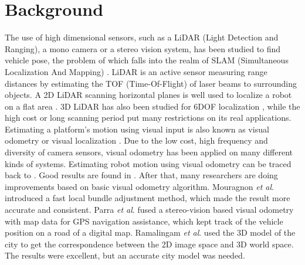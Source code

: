 \documentclass[letterpaper, 10 pt, conference]{ieeeconf}  %
\begin{document}
\section{Background}
\label{sec_background}

The use of high dimensional sensors, such as a LiDAR (Light Detection and Ranging), a mono camera or a stereo vision system, has been studied to find vehicle pose, the problem of which falls into the realm of SLAM (Simultaneous Localization And Mapping) \cite{durrant2006simultaneous}. LiDAR is an active sensor measuring range distances by estimating the TOF (Time-Of-Flight) of laser beams to surrounding objects. A 2D LiDAR scanning horizontal planes is well used to localize a robot on a flat area \cite{zhang2000line}. 3D LiDAR has also been studied for 6DOF localization \cite{moosmann2011velodyne}, while the high cost or long scanning period put many restrictions on its real applications. Estimating a platform's motion using visual input is also known as visual odometry or visual localization \cite{nister2004visual}. Due to the low cost, high frequency and diversity of camera sensors, visual odometry has been applied on many different kinds of systems.
Estimating robot motion using visual odometry can be traced back to \cite{moravec1980obstacle}. Good results are found in \cite{nister2004visual}. After that, many researchers are doing improvements based on basic visual odometry algorithm. Mouragnon \emph{et al}.\cite{mouragnon2006real} introduced a fast local bundle adjustment method, which made the result more accurate and consistent. Parra \emph{et al}.\cite{parra2011visual} fused a stereo-vision based visual odometry with map data for GPS navigation assistance, which kept track of the vehicle position on a road of a digital map. Ramalingam \emph{et al}.\cite{ramalingam2011pose, ramalingam2010skyline2gps} used the 3D model of the city to get the correspondence between the 2D image space and 3D world space. The results were excellent, but an accurate city model was needed.

\end{document}
